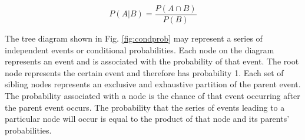 \begin{equation}
\label{eqn:kolmogorov}
P \left(A \vert B \right) = \frac{P \left(A \cap B \right)}{P \left( B \right)}
\end{equation}

The tree diagram shown in Fig. \ref{fig:condprob} may represent a series of independent events or conditional probabilities. Each node on the diagram represents an event and is associated with the probability of that event. The root node represents the certain event and therefore has probability 1. Each set of sibling nodes represents an exclusive and exhaustive partition of the parent event. The probability associated with a node is the chance of that event occurring after the parent event occurs. The probability that the series of events leading to a particular node will occur is equal to the product of that node and its parents' probabilities.

